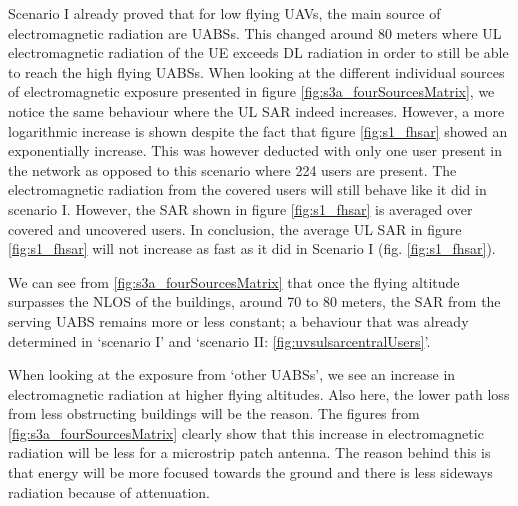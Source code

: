 Scenario I already proved that for low flying \gls{UAV}s, the main source of electromagnetic radiation are \gls{UABS}s. 
This changed around 80 meters where \gls{UL} electromagnetic radiation of the \gls{UE}
exceeds \gls{DL} radiation in order to still be able to reach the high flying \gls{UABS}s. 
When looking at the different individual sources of electromagnetic exposure presented in figure \ref{fig:s3a_fourSourcesMatrix}, we notice the same behaviour where the 
 \gls{UL} \gls{SAR} indeed increases. However, a more logarithmic increase is shown
  despite the fact that figure \ref{fig:s1_fhsar} showed an exponentially increase.
This was however deducted with only one user present in the network as opposed to this scenario 
where 224 users are present. 
The electromagnetic radiation from the covered users will still behave like it did in scenario I.
However, the \gls{SAR} shown in figure  \ref{fig:s1_fhsar} is averaged  over covered and uncovered users.
In conclusion, the average  \gls{UL} \gls{SAR} in  figure \ref{fig:s1_fhsar} will not increase as fast as it did
in Scenario I (fig. \ref{fig:s1_fhsar}).

We can see from \ref{fig:s3a_fourSourcesMatrix} that once the flying altitude surpasses the \gls{NLOS} of the buildings, 
around 70 to 80 meters, the SAR from the serving \gls{UABS} remains 
more or less constant; a behaviour that was already determined in `scenario I' and `scenario II: \ref{fig:uvsulsarcentralUsers}'. 

When looking at the exposure from `other \gls{UABS}s', we see an increase in electromagnetic radiation at higher 
flying altitudes.
Also here, the lower path loss from less obstructing buildings will be the reason.
The figures from \ref{fig:s3a_fourSourcesMatrix} clearly show that this increase 
in electromagnetic radiation will be less for a microstrip patch antenna. The reason behind this is that energy 
will be more focused towards the ground and there is less sideways radiation because of attenuation.

